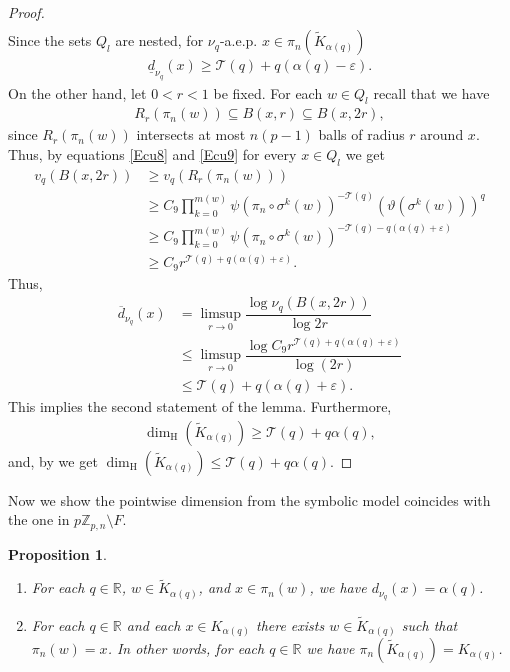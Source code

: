 \documentclass[11pt]{amsart}
\newtheorem{proposition}[theorem]{Proposition}
\theoremstyle{remark}
\numberwithin{equation}{section}
\newcommand{\Z}{\mathbb{Z}}
\begin{document}
\begin{proof}
\begin{align*}
\end{align*} Since the sets $Q_{l}$ are nested, for $\nu_{q}$-a.e.p. $x\in \pi_{n}(\tilde{K}_{\alpha(q)})$ 
\begin{align*}
    \underline{d}_{\nu_{q}}(x)\geq\mathcal{T}(q)+q(\alpha(q)-\varepsilon).
\end{align*} On the other hand, let $0<r<1$ be fixed. For each $w\in Q_{l}$ recall that we have
\begin{align*}
    R_{r}(\pi_{n}(w))\subseteq B(x,r) \subseteq B(x,2r),
\end{align*}since $R_{r}(\pi_{n}(w))$ intersects at most $n(p-1)$ balls of radius $r$ around $x$. Thus, by equations \eqref{Ecu8} and \eqref{Ecu9} for every $x\in Q_{l}$ we get
\begin{align*}
    v_{q}(B(x,2r))&\geq v_{q}(R_{r}(\pi_{n}(w)))\\
    & \geq C_{9}\prod^{m(w)}_{k=0}\psi(\pi_{n}\circ \sigma^{k}(w))^{-\mathcal{T}(q)}(\vartheta(\sigma^{k}(w)))^{q}\\
    &\geq C_{9}\prod^{m(w)}_{k=0}\psi(\pi_{n}\circ\sigma^{k}(w))^{-\mathcal{T}(q)-q(\alpha(q)+\varepsilon)}\\
    & \geq C_{9}r^{\mathcal{T}(q)+q(\alpha(q)+\varepsilon)}.
\end{align*} Thus,
\begin{align*}
    \overline{d}_{\nu_{q}}(x)&=\limsup_{r\to 0}\dfrac{\log \nu_{q}(B(x,2r))}{\log 2r}\\
    & \leq \limsup_{r\to 0}\dfrac{\log C_{9}r^{\mathcal{T}(q)+q(\alpha(q)+\varepsilon)}}{\log(2r)}\\
    & \leq \mathcal{T}(q)+q(\alpha(q)+\varepsilon).
\end{align*} This implies the second statement of the lemma. Furthermore, 
\begin{align*}
    \dim_{\mathrm{H}}(\tilde{K}_{\alpha(q)})\geq \mathcal{T}(q)+q\alpha(q),
\end{align*}and, by \cite[Proposition 2.3]{fa} we get $\dim_{\mathrm{H}}(\tilde{K}_{\alpha(q)})\leq \mathcal{T}(q)+q\alpha(q)$.\end{proof}
\noindent Now we show the pointwise dimension from the symbolic model coincides with the one in $p\Z_{p,n}\setminus F$.
\begin{proposition}\label{Proposition 1}
\hfill    \begin{enumerate}
        \item For each $q\in \mathbb{R}$, $w\in \tilde{K}_{\alpha(q)}$, and $x\in \pi_{n}(w)$, we have $d_{\nu_{q}}(x)=\alpha(q)$.
        \item For each $q\in \mathbb{R}$ and each $x\in K_{\alpha(q)}$ there exists $w\in \tilde{K}_{\alpha(q)}$ such that $\pi_{n}(w)=x$.  In other words, for each $q\in \mathbb{R}$ we have $\pi_{n}(\tilde{K}_{\alpha(q)})=K_{\alpha(q)}$. 
    \end{enumerate}
\end{proposition}
\end{document}
